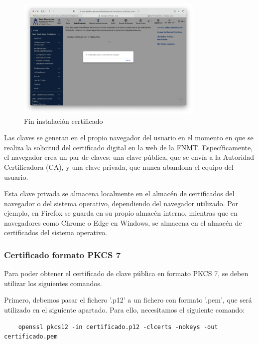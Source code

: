 \begin{figure}[H]   
    \centering
    \includegraphics[width=0.8\textwidth]{fin_instalacion_ej5a.png}
    \caption{Fin instalación certificado}
    \label{fig:fin_instalacion}
\end{figure}

Las claves se generan en el propio navegador del usuario en el momento en que se realiza la solicitud del certificado digital en la web de la FNMT. Específicamente, el navegador crea un par de claves: una clave pública, que se envía a la Autoridad Certificadora (CA), y una clave privada, que nunca abandona el equipo del usuario.  

Esta clave privada se almacena localmente en el almacén de certificados del navegador o del sistema operativo, dependiendo del navegador utilizado. Por ejemplo, en Firefox se guarda en su propio almacén interno, mientras que en navegadores como Chrome o Edge en Windows, se almacena en el almacén de certificados del sistema operativo. 

\subsubsection{Certificado formato PKCS 7}

Para poder obtener el certificado de clave pública en formato PKCS 7, se deben utilizar los siguientes comandos.

Primero, debemos pasar el fichero '.p12' a un fichero con formato '.pem', que será utilizado en el siguiente apartado. Para ello, necesitamos el siguiente comando:

\begin{verbatim}
    openssl pkcs12 -in certificado.p12 -clcerts -nokeys -out certificado.pem
\end{verbatim}

